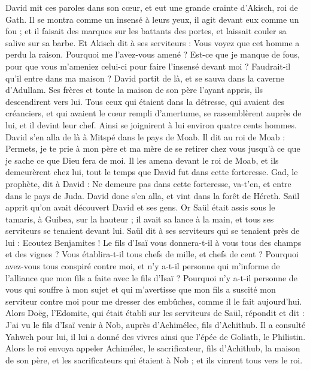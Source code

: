 \begin{multicols}{2}
David mit ces paroles dans son cœur, et eut une grande crainte d'Akisch, roi de Gath.
Il se montra comme un insensé à leurs yeux, il agit devant eux comme un fou ; et il faisait des marques sur les battants des portes, et laissait couler sa salive sur sa barbe.
Et Akisch dit à ses serviteurs : Vous voyez que cet homme a perdu la raison. Pourquoi me l'avez-vous amené ?
Est-ce que je manque de fous, pour que vous m’ameniez celui-ci pour faire l'insensé devant moi ? Faudrait-il qu’il entre dans ma maison ?
\VerseOne{}David partit de là, et se sauva dans la caverne d'Adullam. Ses frères et toute la maison de son père l’ayant appris, ils descendirent vers lui.
Tous ceux qui étaient dans la détresse, qui avaient des créanciers, et qui avaient le cœur rempli d'amertume, se rassemblèrent auprès de lui, et il devint leur chef. Ainsi se joignirent à lui environ quatre cents hommes.
David s'en alla de là à Mitspé dans le pays de Moab. Il dit au roi de Moab : Permets, je te prie à mon père et ma mère de se retirer chez vous jusqu'à ce que je sache ce que Dieu fera de moi.
Il les amena devant le roi de Moab, et ils demeurèrent chez lui, tout le temps que David fut dans cette forteresse.
Gad, le prophète, dit à David : Ne demeure pas dans cette forteresse, va-t'en, et entre dans le pays de Juda. David donc s'en alla, et vint dans la forêt de Héreth.
Saül apprit qu'on avait découvert David et ses gens. Or Saül était assis sous le tamaris, à Guibea, sur la hauteur ; il avait sa lance à la main, et tous ses serviteurs se tenaient devant lui.
Saül dit à ses serviteurs qui se tenaient près de lui : Ecoutez Benjamites ! Le fils d'Isaï vous donnera-t-il à vous tous des champs et des vignes ? Vous établira-t-il tous chefs de mille, et chefs de cent ?
Pourquoi avez-vous tous conspiré contre moi, et n'y a-t-il personne qui m’informe de l’alliance que mon fils a faite avec le fils d'Isaï ? Pourquoi n’y a-t-il personne de vous qui souffre à mon sujet et qui m'avertisse que mon fils a suscité mon serviteur contre moi pour me dresser des embûches, comme il le fait aujourd'hui.
Alors Doëg, l’Edomite, qui était établi sur les serviteurs de Saül, répondit et dit : J'ai vu le fils d'Isaï venir à Nob, auprès d’Achimélec, fils d'Achithub.
Il a consulté Yahweh pour lui, il lui a donné des vivres ainsi que l'épée de Goliath, le Philistin.
Alors le roi envoya appeler Achimélec, le sacrificateur, fils d'Achithub, la maison de son père, et les sacrificateurs qui étaient à Nob ; et ils vinrent tous vers le roi.

\end{multicols}
